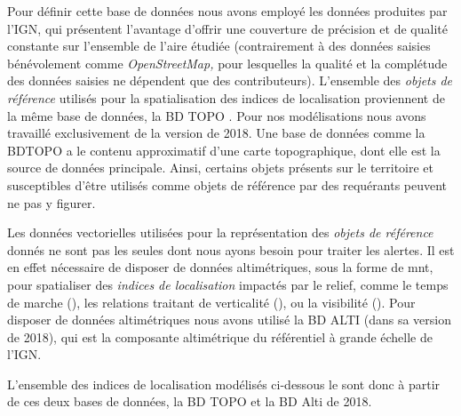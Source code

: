 Pour définir cette base de données nous avons employé les données
produites par l'IGN, qui présentent l'avantage d'offrir une couverture
de précision et de qualité constante sur l'ensemble de l'aire étudiée
(contrairement à des données saisies bénévolement comme
\emph{OpenStreetMap,} pour lesquelles la qualité et la complétude des
données saisies ne dépendent que des contributeurs). L'ensemble des
\emph{objets de référence} utilisés pour la spatialisation des indices
de localisation proviennent de la même base de données, la BD TOPO
\autocite{IGN2020}. Pour nos modélisations nous avons travaillé
exclusivement de la version de 2018. Une base de données comme la
BDTOPO a le contenu approximatif d'une carte topographique, dont elle
est la source de données principale. Ainsi, certains objets présents
sur le territoire et susceptibles d'être utilisés comme objets de
référence par des requérants peuvent ne pas y figurer.

Les données vectorielles utilisées pour la représentation des
\emph{objets de référence} donnés ne sont pas les seules dont nous
ayons besoin pour traiter les alertes. Il est en effet nécessaire de
disposer de données altimétriques, sous la forme de \ac{mnt}, pour
spatialiser des \emph{indices de localisation} impactés par le relief,
comme le temps de marche (), les
relations traitant de verticalité (\eg {}), ou
la visibilité (). Pour disposer de
données altimétriques nous avons utilisé la BD ALTI
\autocite{IGN2020a} (dans sa version de 2018), qui est la composante
altimétrique du référentiel à grande échelle de l'IGN.

L'ensemble des indices de localisation modélisés ci-dessous le sont
donc à partir de ces deux bases de données, la BD TOPO et la BD Alti
de 2018.

